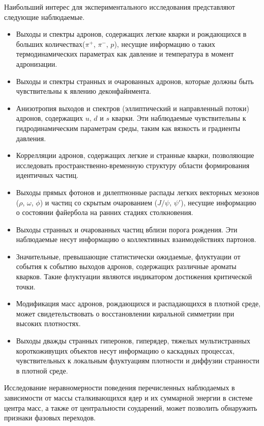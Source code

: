 Наибольший интерес для экспериментального исследования представляют следующие наблюдаемые.

\begin{itemize}
\item Выходы и спектры адронов, содержащих легкие кварки и рождающихся в больших количествах($\pi^{+}$, $\pi^{-}$, $p$), несущие информацию о таких термодинамических параметрах как давление и температура в момент адронизации.
\item Выходы и спектры странных и очарованных адронов, которые должны быть чувствительны к явлению деконфайнмента.
\item Анизотропия выходов и спектров (эллиптический и направленный потоки) адронов, содержащих $u$, $d$ и $s$ кварки. Эти наблюдаемые чувствительны к гидродинамическим параметрам среды, таким как вязкость и градиенты давления.
\item Коррелляции адронов, содержащих легкие и странные кварки, позволяющие исследовать пространственно-временную структуру области формирования идентичных частиц.
\item Выходы прямых фотонов и дилептнонные распады легких векторных мезонов ($\rho$, $\omega$, $\phi$) и частиц со скрытым очарованием ($J/\psi$, $\psi'$), несущие информацию о состоянии файербола на ранних стадиях столкновения.
\item Выходы странных и очарованных частиц вблизи порога рождения. Эти наблюдаемые несут информацию о коллективных взаимодействиях партонов.
\item Значительные, превышающие статистически ожидаемые, флуктуации от события к событию выходов адронов, содержащих различные ароматы кварков. Такие флуктуации являются индикатором достижения критической точки.
\item Модификация масс адронов, рождающихся и распадающихся в плотной среде, может свидетельствовать о восстановлении киральной симметрии при высоких плотностях.
\item Выходы дважды странных гиперонов, гиперядер, тяжелых мультистранных короткоживущих объектов несут информацию о каскадных процессах, чувствительных к локальным флуктуациям плотности и диффузии странности в плотной среде.
\end{itemize}

Исследование неравномерности поведения перечисленных наблюдаемых в зависимости от массы сталкивающихся ядер и их суммарной энергии в системе центра масс, а также от центральности соударений, может позволить обнаружить признаки фазовых переходов.

